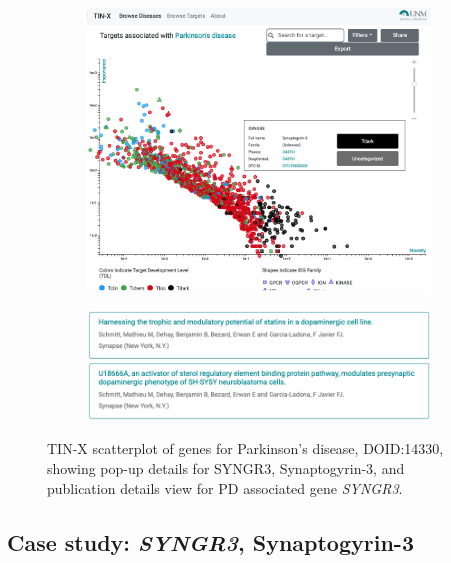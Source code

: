 \begin{figure}[h]

\begin{subfigure}{1.0\textwidth}
\includegraphics[width=0.95\linewidth]{figures/kgap/KGAP_TINX_SYNRG3_rev3.png} 
\caption{}
\label{fig:TINXa}
\end{subfigure}
\begin{subfigure}{1.0\textwidth}
\includegraphics[width=0.95\linewidth]{figures/kgap/KGAP_TINX_SYNRG3articles_rev2.png}
\caption{}
\label{fig:TINXb}
\end{subfigure}

\caption{TIN-X scatterplot of genes for Parkinson's disease, DOID:14330, showing pop-up details for SYNGR3, Synaptogyrin-3, and publication details view for PD associated gene \emph{SYNGR3}.}
\label{fig:TINX}
\end{figure}

\subsection{Case study: \emph{SYNGR3}, Synaptogyrin-3}

